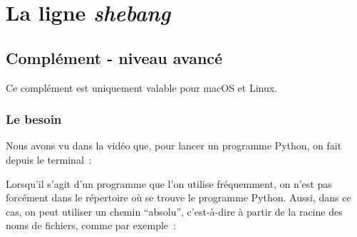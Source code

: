     
    
    
    

    

    \hypertarget{la-ligne-shebang}{%
\section{\texorpdfstring{La ligne
\emph{shebang}}{La ligne shebang}}\label{la-ligne-shebang}}

    \begin{Shaded}
\begin{Highlighting}[frame=lines,framerule=0.6mm,rulecolor=\color{asisframecolor}]
\end{Highlighting}
\end{Shaded}

    \hypertarget{compluxe9ment---niveau-avancuxe9}{%
\subsection{Complément - niveau
avancé}\label{compluxe9ment---niveau-avancuxe9}}

    Ce complément est uniquement valable pour macOS et Linux.

    \hypertarget{le-besoin}{%
\subsubsection{Le besoin}\label{le-besoin}}

    Nous avons vu dans la vidéo que, pour lancer un programme Python, on
fait depuis le terminal~:

    \begin{Shaded}
\begin{Highlighting}[frame=lines,framerule=0.6mm,rulecolor=\color{asisframecolor}]
\NormalTok{$ }
\end{Highlighting}
\end{Shaded}

    Lorsqu'il s'agit d'un programme que l'on utilise fréquemment, on n'est
pas forcément dans le répertoire où se trouve le programme Python.
Aussi, dans ce cas, on peut utiliser un chemin ``absolu'', c'est-à-dire
à partir de la racine des noms de fichiers, comme par exemple~:

    \begin{Shaded}
\begin{Highlighting}[frame=lines,framerule=0.6mm,rulecolor=\color{asisframecolor}]
\NormalTok{$ }
\end{Highlighting}
\end{Shaded}

